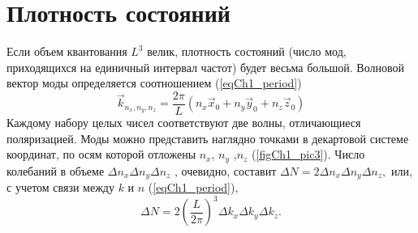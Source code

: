 \section{Плотность состояний}
Если объем квантования $L^3$ велик, плотность состояний (число мод,
приходящихся на единичный интервал частот) будет весьма
большой. Волновой вектор моды определяется соотношением
(\ref{eqCh1_period})
\begin{equation}
\vec{k}_{n_x, n_y, n_z} = \frac{2 \pi}{L}\left(n_x \vec{x}_0
+ n_y \vec{y}_0
+ n_z \vec{z}_0
\right)
\end{equation}
Каждому набору целых чисел соответствуют две волны, отличающиеся
поляризацией. Моды можно представить наглядно точками в декартовой
системе координат, по осям которой отложены  $n_x$, $n_y$  ,$n_z$
(\autoref{figCh1_pic3}). Число колебаний в объеме  
\(
\Delta n_x \Delta n_y \Delta n_z
\)
, очевидно, составит  
\(
\Delta N = 2 \Delta n_x \Delta n_y \Delta n_z,
\)
или, с учетом связи  
между  $k$  и  $n$  (\ref{eqCh1_period}),
\begin{equation}
\Delta N = 2 \left(\frac{L}{2 \pi} \right)^3 \Delta k_x \Delta k_y \Delta k_z.
\label{eqCh1_modenumber}
\end{equation}






